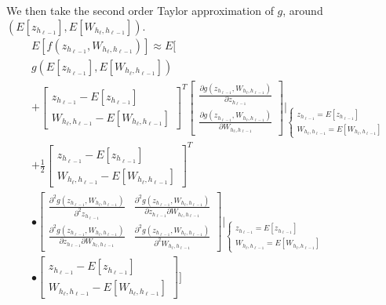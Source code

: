 We then take the second order Taylor approximation of $g$, around $(E[z_{h_{\ell-1}}], E[W_{h_{\ell}, h_{\ell-1}}])$.
\begin{equation}
\begin{aligned}
&E[f(z_{h_{\ell-1}}, W_{h_{\ell}, h_{\ell-1}})] \approx
E\Bigg[\\
&g(E[z_{h_{\ell-1}}], E[W_{h_{\ell}, h_{\ell-1}}])\\
&+ \begin{bmatrix}
z_{h_{\ell-1}} - E[z_{h_{\ell-1}}] \\ W_{h_{\ell}, h_{\ell-1}} - E[W_{h_{\ell}, h_{\ell-1}}]
\end{bmatrix}^T \begin{bmatrix}
\frac{\partial g(z_{h_{\ell-1}}, W_{h_{\ell}, h_{\ell-1}})}{\partial z_{h_{\ell-1}}} \\
\frac{\partial g(z_{h_{\ell-1}}, W_{h_{\ell}, h_{\ell-1}})}{\partial W_{h_{\ell}, h_{\ell-1}}}
\end{bmatrix} \Bigg\rvert_{
\begin{cases}
z_{h_{\ell-1}} = E[z_{h_{\ell-1}}] \\
W_{h_{\ell}, h_{\ell-1}} = E[W_{h_{\ell}, h_{\ell-1}}]
\end{cases}
} \\
&+ \frac{1}{2} \begin{bmatrix}
z_{h_{\ell-1}} - E[z_{h_{\ell-1}}] \\ W_{h_{\ell}, h_{\ell-1}} - E[W_{h_{\ell}, h_{\ell-1}}]
\end{bmatrix}^T \\
&\bullet \begin{bmatrix}
\frac{\partial^2 g(z_{h_{\ell-1}}, W_{h_{\ell}, h_{\ell-1}})}{\partial^2 z_{h_{\ell-1}}} & \frac{\partial^2 g(z_{h_{\ell-1}}, W_{h_{\ell}, h_{\ell-1}})}{\partial z_{h_{\ell-1}} \partial W_{h_{\ell}, h_{\ell-1}}} \\
\frac{\partial^2 g(z_{h_{\ell-1}}, W_{h_{\ell}, h_{\ell-1}})}{\partial z_{h_{\ell-1}} \partial W_{h_{\ell}, h_{\ell-1}}} & \frac{\partial^2 g(z_{h_{\ell-1}}, W_{h_{\ell}, h_{\ell-1}})}{\partial^2 W_{h_{\ell}, h_{\ell-1}}}
\end{bmatrix} \Bigg\rvert_{
\begin{cases}
z_{h_{\ell-1}} = E[z_{h_{\ell-1}}] \\
W_{h_{\ell}, h_{\ell-1}} = E[W_{h_{\ell}, h_{\ell-1}}]
\end{cases}
} \\
&\bullet \begin{bmatrix}
z_{h_{\ell-1}} - E[z_{h_{\ell-1}}] \\ W_{h_{\ell}, h_{\ell-1}} - E[W_{h_{\ell}, h_{\ell-1}}]
\end{bmatrix}\Bigg]
\end{aligned}
\end{equation}

